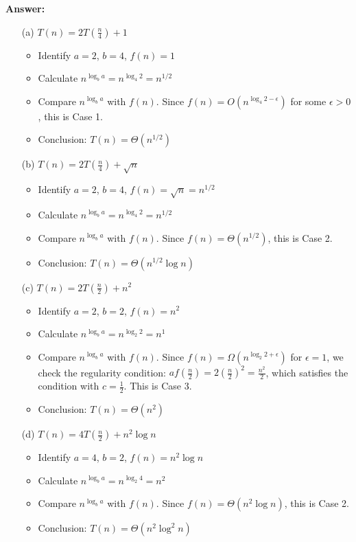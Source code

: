 \documentclass[12pt]{article}
\begin{document}
\newpage
{\bf Answer:}

\begin{itemize}
    \item[(a)] $T(n) = 2 T\left(\frac{n}{4}\right) + 1$
    \begin{itemize}
        \item Identify $a = 2$, $b = 4$, $f(n) = 1$
        \item Calculate $n^{\log_b a} = n^{\log_4 2} = n^{1/2}$
        \item Compare $n^{\log_b a}$ with $f(n)$. Since $f(n) = O(n^{\log_4 2 - \epsilon})$ for some $\epsilon > 0$, this is Case 1.
        \item Conclusion: $T(n) = \Theta(n^{1/2})$
    \end{itemize}

    \item[(b)] $T(n) = 2 T\left(\frac{n}{4}\right) + \sqrt{n}$
    \begin{itemize}
        \item Identify $a = 2$, $b = 4$, $f(n) = \sqrt{n} = n^{1/2}$
        \item Calculate $n^{\log_b a} = n^{\log_4 2} = n^{1/2}$
        \item Compare $n^{\log_b a}$ with $f(n)$. Since $f(n) = \Theta(n^{1/2})$, this is Case 2.
        \item Conclusion: $T(n) = \Theta(n^{1/2} \log n)$
    \end{itemize}

    \item[(c)] $T(n) = 2 T\left(\frac{n}{2}\right) + n^2$
    \begin{itemize}
        \item Identify $a = 2$, $b = 2$, $f(n) = n^2$
        \item Calculate $n^{\log_b a} = n^{\log_2 2} = n^1$
        \item Compare $n^{\log_b a}$ with $f(n)$. Since $f(n) = \Omega(n^{\log_2 2 + \epsilon})$ for $\epsilon = 1$, we check the regularity condition: $a f\left(\frac{n}{2}\right) = 2 \left(\frac{n}{2}\right)^2 = \frac{n^2}{2}$, which satisfies the condition with $c = \frac{1}{2}$. This is Case 3.
        \item Conclusion: $T(n) = \Theta(n^2)$
    \end{itemize}

    \item[(d)] $T(n) = 4 T\left(\frac{n}{2}\right) + n^2 \log n$
    \begin{itemize}
        \item Identify $a = 4$, $b = 2$, $f(n) = n^2 \log n$
        \item Calculate $n^{\log_b a} = n^{\log_2 4} = n^2$
        \item Compare $n^{\log_b a}$ with $f(n)$. Since $f(n) = \Theta(n^2 \log n)$, this is Case 2.
        \item Conclusion: $T(n) = \Theta(n^2 \log^2 n)$
    \end{itemize}
\end{itemize}
\end{document}
